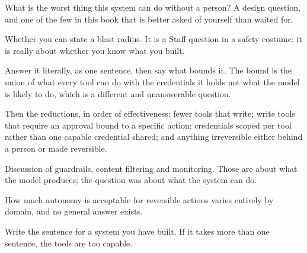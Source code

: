 \begin{bankq}{What is the worst thing this system can do without a person?}
\qasked
A design question, and one of the few in this book that is better asked of
yourself than waited for.

\qtested
Whether you can state a blast radius. It is a Staff question in a safety
costume: it is really about whether you know what you built.

\qstaff
Answer it literally, as one sentence, then say what bounds it. The bound is
the union of what every tool can do with the credentials it holds \dash{} not
what the model is likely to do, which is a different and unanswerable question.

Then the reductions, in order of effectiveness: fewer tools that write; write
tools that require an approval bound to a specific action; credentials scoped
per tool rather than one capable credential shared; and anything irreversible
either behind a person or made reversible.


\qsenior
Discussion of guardrails, content filtering and monitoring. Those are about
what the model produces; the question was about what the system can do.

\qcontested
How much autonomy is acceptable for reversible actions varies entirely by
domain, and no general answer exists.

\qdrill
Write the sentence for a system you have built. If it takes more than one
sentence, the tools are too capable.
\end{bankq}

